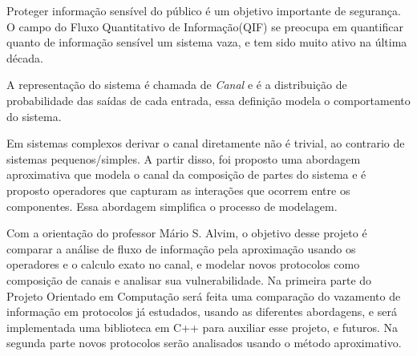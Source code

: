 Proteger informação sensível do público é um objetivo importante de segurança. O campo do Fluxo Quantitativo de Informação(QIF) se preocupa em quantificar quanto de informação sensível um sistema vaza, e tem sido muito ativo na última década.

A representação do sistema é chamada de \emph{Canal} e é a distribuição de probabilidade das saídas de cada entrada, essa definição modela o comportamento do sistema.

Em sistemas complexos derivar o canal diretamente não é trivial, ao contrario de sistemas pequenos/simples.
A partir disso, foi proposto uma abordagem aproximativa que modela o canal da composição de partes do sistema e é proposto operadores que capturam as interações que ocorrem entre os componentes. %
Essa abordagem simplifica o processo de modelagem. %

Com a orientação do professor Mário S. Alvim, o objetivo desse projeto é comparar a análise de fluxo de informação pela aproximação usando os operadores e o calculo exato no canal, e modelar novos protocolos como composição de canais e analisar sua vulnerabilidade.
Na primeira parte do Projeto Orientado em Computação será feita uma comparação do vazamento de informação em protocolos já estudados, usando as diferentes abordagens, e será implementada uma biblioteca em C++ para auxiliar esse projeto, e futuros. 
Na segunda parte novos protocolos serão analisados usando o método aproximativo.
